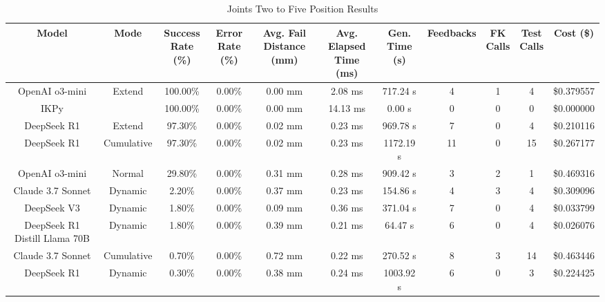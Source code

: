 \begin{table}[H]
\tiny
\renewcommand{\arraystretch}{1.2}
\caption{Joints Two to Five Position Results}
\begin{center}
\begin{tabular}{|c|c|c|c|c|c|c|c|c|c|c|}
    \hline
    \textbf{Model} & 
    \textbf{Mode} & 
    \makecell{\textbf{Success}\\\textbf{Rate (\%)}} &
    \makecell{\textbf{Error}\\\textbf{Rate (\%)}} &
    \makecell{\textbf{Avg. Fail}\\\textbf{Distance (mm)}} &
    \makecell{\textbf{Avg. Elapsed}\\\textbf{Time (ms)}} &
    \makecell{\textbf{Gen.}\\\textbf{Time (s)}} &
    \textbf{Feedbacks} &
    \makecell{\textbf{FK}\\\textbf{Calls}} &
    \makecell{\textbf{Test}\\\textbf{Calls}} &
    \textbf{Cost (\$)} \\
    \hline
    OpenAI o3-mini & Extend & 100.00\% & 0.00\% & 0.00 mm & 2.08 ms & 717.24 s & 4 & 1 & 4 & \$0.379557 \\
    \hline
    IKPy &  & 100.00\% & 0.00\% & 0.00 mm & 14.13 ms & 0.00 s & 0 & 0 & 0 & \$0.000000 \\
    \hline
    DeepSeek R1 & Extend & 97.30\% & 0.00\% & 0.02 mm & 0.23 ms & 969.78 s & 7 & 0 & 4 & \$0.210116 \\
    \hline
    DeepSeek R1 & Cumulative & 97.30\% & 0.00\% & 0.02 mm & 0.23 ms & 1172.19 s & 11 & 0 & 15 & \$0.267177 \\
    \hline
    OpenAI o3-mini & Normal & 29.80\% & 0.00\% & 0.31 mm & 0.28 ms & 909.42 s & 3 & 2 & 1 & \$0.469316 \\
    \hline
    Claude 3.7 Sonnet & Dynamic & 2.20\% & 0.00\% & 0.37 mm & 0.23 ms & 154.86 s & 4 & 3 & 4 & \$0.309096 \\
    \hline
    DeepSeek V3 & Dynamic & 1.80\% & 0.00\% & 0.09 mm & 0.36 ms & 371.04 s & 7 & 0 & 4 & \$0.033799 \\
    \hline
    DeepSeek R1 Distill Llama 70B & Dynamic & 1.80\% & 0.00\% & 0.39 mm & 0.21 ms & 64.47 s & 6 & 0 & 4 & \$0.026076 \\
    \hline
    Claude 3.7 Sonnet & Cumulative & 0.70\% & 0.00\% & 0.72 mm & 0.22 ms & 270.52 s & 8 & 3 & 14 & \$0.463446 \\
    \hline
    DeepSeek R1 & Dynamic & 0.30\% & 0.00\% & 0.38 mm & 0.24 ms & 1003.92 s & 6 & 0 & 3 & \$0.224425 \\

\end{tabular}
\end{center}
\end{table}

